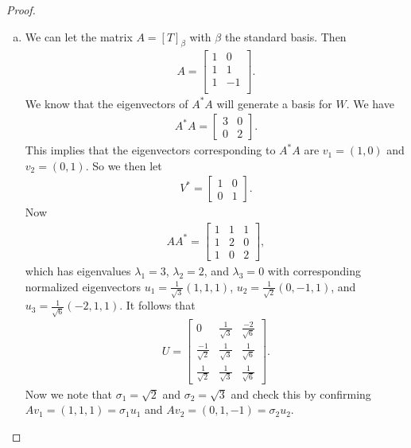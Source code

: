 \documentclass[leqno]{article}
\theoremstyle{nonumberplain}
\newtheorem{proof}{Proof}
\begin{document}
\begin{proof}
\begin{enumerate}[(a)]
\item We can let the matrix $A=[T]_\beta$ with $\beta$ the standard basis. Then 
\begin{align*}
A=\begin{bmatrix}
1 & 0\\
1 & 1\\
1 & -1\\
\end{bmatrix}.
\end{align*}
We know that the eigenvectors of $A^*A$ will generate a basis for $W$.  We have
\begin{align*}
A^*A=
\begin{bmatrix}
3 & 0\\
0 & 2
\end{bmatrix}.
\end{align*}
This implies that the eigenvectors corresponding to $A^*A$ are $v_1=(1,0)$ and $v_2=(0,1)$. So we then let
\begin{align*}
V^*=\begin{bmatrix}
1 & 0\\
0 & 1
\end{bmatrix}.
\end{align*}
Now
\begin{align*}
AA^*= \begin{bmatrix}
1 & 1 & 1\\
1 & 2 & 0\\
1 & 0 & 2
\end{bmatrix}, 
\end{align*}
which has eigenvalues $\lambda_1=3$, $\lambda_2=2$, and $\lambda_3=0$ with corresponding normalized eigenvectors $u_1=\frac{1}{\sqrt{3}}(1,1,1)$, $u_2=\frac{1}{\sqrt{2}}(0,-1,1)$, and $u_3=\frac{1}{\sqrt{6}}(-2,1,1)$. It follows that
\begin{align*}
U=\begin{bmatrix}
0 & \frac{1}{\sqrt{3}} & \frac{-2}{\sqrt{6}}\\
\frac{-1}{\sqrt{2}} & \frac{1}{\sqrt{3}} & \frac{1}{\sqrt{6}}\\
\frac{1}{\sqrt{2}} & \frac{1}{\sqrt{3}} & \frac{1}{\sqrt{6}}
\end{bmatrix}.
\end{align*}
Now we note that $\sigma_1=\sqrt{2}$ and $\sigma_2=\sqrt{3}$ and check this by confirming $Av_1=(1,1,1)=\sigma_1 u_1$ and $Av_2=(0,1,-1)=\sigma_2 u_2$.  


\end{enumerate}
\end{proof}
\end{document}

